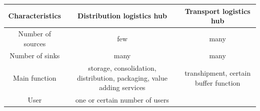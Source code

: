 \documentclass[
]{book}
\begin{document}
\begin{longtable}[]{@{}ccc@{}}
\toprule
\begin{minipage}[b]{0.30\columnwidth}\centering
Characteristics\strut
\end{minipage} & \begin{minipage}[b]{0.30\columnwidth}\centering
Distribution logistics hub\strut
\end{minipage} & \begin{minipage}[b]{0.30\columnwidth}\centering
Transport logistics hub\strut
\end{minipage}\tabularnewline
\midrule
\endhead
\begin{minipage}[t]{0.30\columnwidth}\centering
Number of sources\strut
\end{minipage} & \begin{minipage}[t]{0.30\columnwidth}\centering
few\strut
\end{minipage} & \begin{minipage}[t]{0.30\columnwidth}\centering
many\strut
\end{minipage}\tabularnewline
\begin{minipage}[t]{0.30\columnwidth}\centering
Number of sinks\strut
\end{minipage} & \begin{minipage}[t]{0.30\columnwidth}\centering
many\strut
\end{minipage} & \begin{minipage}[t]{0.30\columnwidth}\centering
many\strut
\end{minipage}\tabularnewline
\begin{minipage}[t]{0.30\columnwidth}\centering
Main function\strut
\end{minipage} & \begin{minipage}[t]{0.30\columnwidth}\centering
storage, consolidation, distribution, packaging, value adding services\strut
\end{minipage} & \begin{minipage}[t]{0.30\columnwidth}\centering
transhipment, certain buffer function\strut
\end{minipage}\tabularnewline
\begin{minipage}[t]{0.30\columnwidth}\centering
User\strut
\end{minipage} & \begin{minipage}[t]{0.30\columnwidth}\centering
one or certain number of users\strut
\end{minipage} & \begin{minipage}[t]{0.30\columnwidth}\centering

\end{minipage}
\end{longtable}
\end{document}
